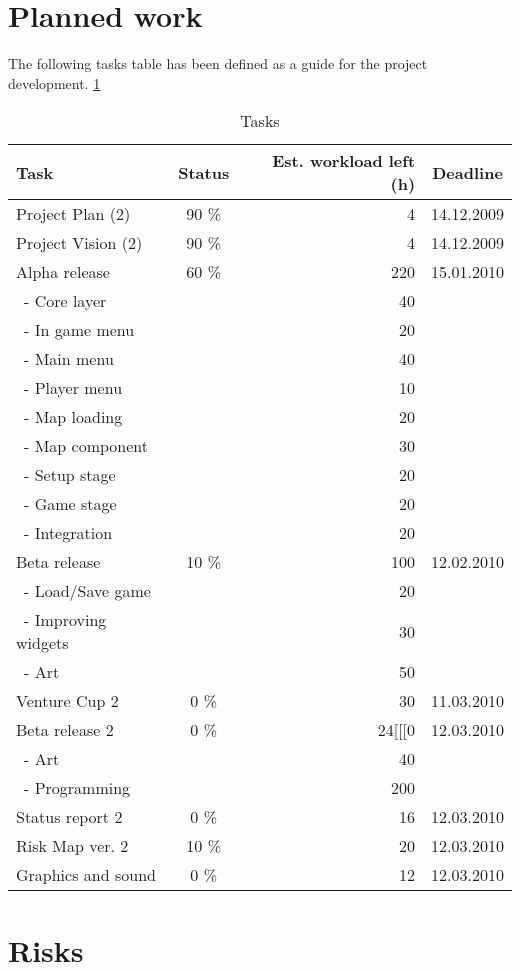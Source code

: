 \documentclass[12pt,a4paper]{article}
\begin{document}
\section{Planned work}

The following tasks table has been defined as a guide for the project development. \ref{tab:tasks}

\begin{table}[h!]
\small
\begin{tabular}{ l | c | r | c}
Task				&Status		&Est. workload left (h)	&Deadline \\\hline\hline
Project Plan (2) 	&90	\%		&4					&14.12.2009\\
Project Vision (2)	&90 	\%		&4					&14.12.2009\\
Alpha release		&60 	\%		&220				&15.01.2010\\
\ - Core layer		&			&40					&\\
\ - In game menu	&			&20					&\\
\ - Main menu		&			&40					&\\
\ - Player menu		&			&10					&\\
\ - Map loading		&			&20					&\\
\ - Map component	&			&30					&\\
\ - Setup stage		&			&20					&\\
\ - Game stage		&			&20					&\\
\ - Integration		&			&20					&\\
Beta release		&10 \%		&100				&12.02.2010\\
\ - Load/Save game	&			&20					&\\
\ - Improving widgets	&			&30					&\\
\ - Art				&			&50					&\\
Venture Cup 2		&0 \%		&30					&11.03.2010\\
Beta release 2		&0 \%		&24[[[0				&12.03.2010\\
\ - Art				&			&40					&\\
\ - Programming	&			&200				&\\
Status report 2		&0 \%		&16					&12.03.2010\\
Risk Map ver. 2		&10 \%		&20					&12.03.2010\\
Graphics and sound	&0 \%		&12					&12.03.2010
\end{tabular}
\caption{Tasks}
\label{tab:tasks}
\end{table}

\section{Risks}
\end{document}
